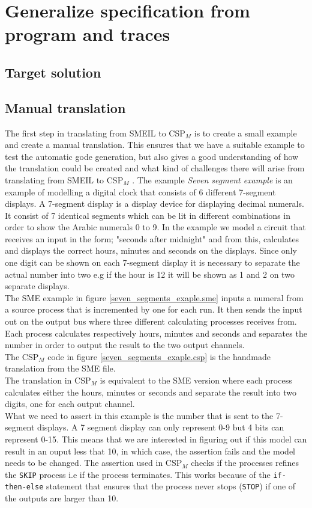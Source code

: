 \documentclass[a4paper]{report}
\newcommand{\cspm}{CSP$_M$ }
\begin{document}
\chapter{Generalize specification from program and traces}
\section{Target solution}

\section{Manual translation}
The first step in translating from SMEIL to \cspm is to create a small example and create a manual translation. This ensures that we have a suitable example to test the automatic gode generation, but also gives a good understanding of how the translation could be created and what kind of challenges there will arise from translating from SMEIL to \cspm.
The example \textit{Seven segment example} is an example of modelling a digital clock that consists of 6 different 7-segment displays. A 7-segment display is a display device for displaying decimal numerals. It consist of 7 identical segments which can be lit in different combinations in order to show the Arabic numerals 0 to 9. In the example we model a circuit that receives an input in the form; "seconds after midnight" and from this, calculates and displays the correct hours, minutes and seconds on the displays. Since only one digit can be shown on each 7-segment display it is necessary to separate the actual number into two e.g if the hour is 12 it will be shown as 1 and 2 on two separate displays. \\ The SME example in figure \ref{seven_segments_exaple.sme} inputs a numeral from a source process that is incremented by one for each run. It then sends the input out on the output bus where three different calculating processes receives from. Each process calculates respectively hours, minutes and seconds and separates the number in order to output the result to the two output channels. \\ The \cspm code in figure \ref{seven_segments_exaple.csp} is the handmade translation from the SME file. \\ The translation in \cspm is equivalent to the SME version where each process calculates either the hours, minutes or seconds and separate the result into two digits, one for each output channel.\\
What we need to assert in this example is the number that is sent to the 7-segment displays. A 7 segment display can only represent 0-9 but 4 bits can represent 0-15. This means that we are interested in figuring out if this model can result in an ouput less that 10, in which case, the assertion fails and the model needs to be changed. The assertion used in \cspm checks if the processes refines the \texttt{SKIP} process i.e if the process terminates. This works because of the \texttt{if-then-else} statement that ensures that the process never stops (\texttt{STOP}) if one of the outputs are larger than 10. \\\\
\end{document}
